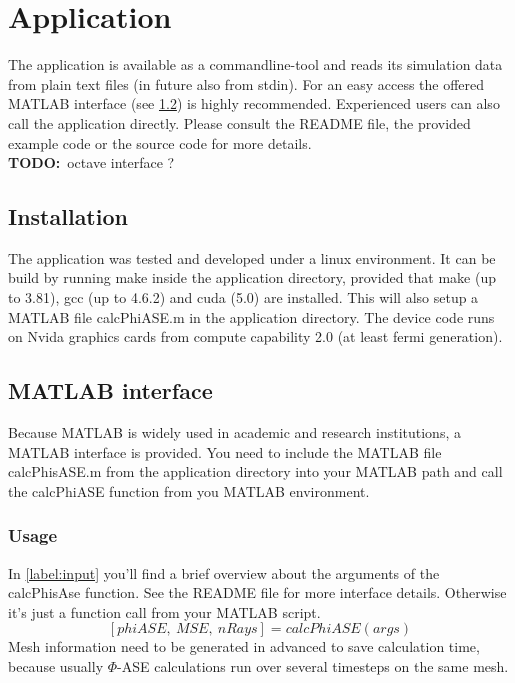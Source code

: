 \section{Application}
The application is available as a commandline-tool and reads
its simulation data from plain text files (in future also from stdin).
For an easy access the offered MATLAB interface (see \ref{label:matlab_interface}) 
is highly recommended. Experienced users can also call the application
directly. Please consult the README file, the provided 
example code or the source code for more details.\\
\textbf{TODO:}~octave interface ?

\subsection{Installation}
The application was tested and developed under a linux environment.
It can be build by running make inside the application directory, provided
that make (up to 3.81), gcc (up to 4.6.2) and cuda (5.0) are installed. 
This will also setup a MATLAB file calcPhiASE.m in the application
directory. The device code runs on Nvida graphics cards from compute 
capability 2.0 (at least fermi generation). 

\subsection{MATLAB interface}
\label{label:matlab_interface}
Because MATLAB is widely used in academic and research institutions, a MATLAB
interface is provided. You need to include the MATLAB file calcPhisASE.m from
the application directory into your MATLAB path and call the calcPhiASE function 
from you MATLAB environment.

\subsubsection{Usage}
In \ref{label:input} you'll find a brief overview about the
arguments of the calcPhisAse function. See the README file for 
more interface details. Otherwise it's just a function call from
your MATLAB script.
\[[phiASE,~MSE,~nRays] = calcPhiASE(args)\]
Mesh information need to be generated in advanced
to save calculation time, because usually $\Phi$-ASE calculations
run over several timesteps on the same mesh. 


